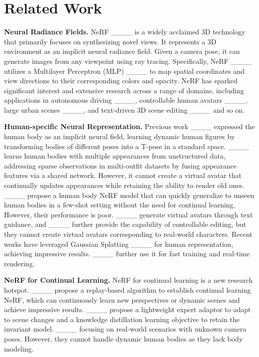 \section{Related Work}
\label{sec:related}
\noindent\textbf{Neural Radiance Fields.}
NeRF ____ is a widely acclaimed 3D technology that primarily focuses on synthesizing novel views. It represents a 3D environment as an implicit neural radiance field. Given a camera pose, it can generate images from any viewpoint using ray tracing. Specifically, NeRF ____ utilizes a Multilayer Perceptron (MLP) ____ to map spatial coordinates and view directions to their corresponding colors and opacity. NeRF has sparked significant interest and extensive research across a range of domains, including applications in autonomous driving ____, controllable human avatars ____, large urban scenes ____, and text-driven 3D scene editing ____ and so on.

\noindent\textbf{Human-specific Neural Representation.}
Previous work ____ expressed the human body as an implicit neural field, learning dynamic human figures by transforming bodies of different poses into a T-pose in a standard space. 
____ learns human bodies with multiple appearances from unstructured data, addressing sparse observations in multi-outfit datasets by fusing appearance features via a shared network. However, it cannot create a virtual avatar that continually updates appearances while retaining the ability to render old ones. ____ propose a human body NeRF model that can quickly generalize to unseen human bodies in a few-shot setting without the need for continual learning. However, their performance is poor. 
____ generate virtual avatars through text guidance, and ____ further provide the capability of controllable editing, but they cannot create virtual avatars corresponding to real-world characters.
Recent works have leveraged Gaussian Splatting ____ for human representation, achieving impressive results. ____ further use it for fast training and real-time rendering.

\noindent\textbf{NeRF for Continual Learning.}
NeRF for continual learning is a new research hotspot. ____ propose a replay-based algorithm to establish continual learning NeRF, which can continuously learn new perspectives or dynamic scenes and achieve impressive results. ____ propose a lightweight expert adaptor to adapt to scene changes and a knowledge distillation learning objective to retain the invariant model. ____ focusing on real-world scenarios with unknown camera poses. However, they cannot handle dynamic human bodies as they lack body modeling.

